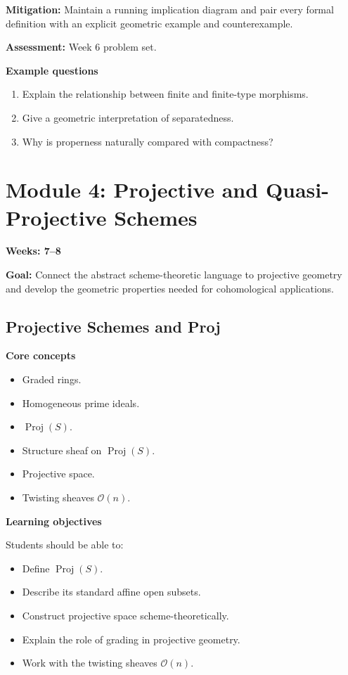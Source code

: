 \documentclass[11pt]{article}
\begin{document}
\textbf{Mitigation:} Maintain a running implication diagram and pair every formal definition with an explicit geometric example and counterexample.

\textbf{Assessment:} Week 6 problem set.

\textbf{Example questions}
\begin{enumerate}
    \item Explain the relationship between finite and finite-type morphisms.
    \item Give a geometric interpretation of separatedness.
    \item Why is properness naturally compared with compactness?
\end{enumerate}

\section{Module 4: Projective and Quasi-Projective Schemes}

\textbf{Weeks: 7--8}

\textbf{Goal:} Connect the abstract scheme-theoretic language to projective geometry and develop the geometric properties needed for cohomological applications.

\subsection{Projective Schemes and Proj}

\textbf{Core concepts}
\begin{itemize}
    \item Graded rings.
    \item Homogeneous prime ideals.
    \item $\operatorname{Proj}(S)$.
    \item Structure sheaf on $\operatorname{Proj}(S)$.
    \item Projective space.
    \item Twisting sheaves $\mathcal{O}(n)$.
\end{itemize}

\textbf{Learning objectives}

Students should be able to:
\begin{itemize}
    \item Define $\operatorname{Proj}(S)$.
    \item Describe its standard affine open subsets.
    \item Construct projective space scheme-theoretically.
    \item Explain the role of grading in projective geometry.
    \item Work with the twisting sheaves $\mathcal{O}(n)$.
\end{itemize}
\end{document}
